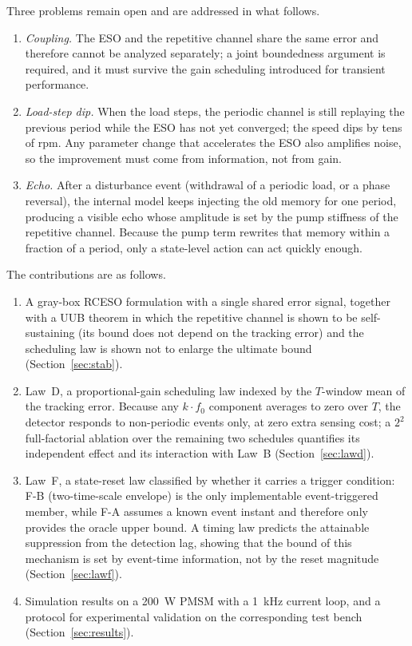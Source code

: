 \documentclass[journal]{IEEEtran}
\theoremstyle{remark}
\begin{document}
Three problems remain open and are addressed in what follows.
\begin{enumerate}
\item \emph{Coupling.} The ESO and the repetitive channel share the same
error and therefore cannot be analyzed separately; a joint boundedness argument is
required, and it must survive the gain scheduling introduced for transient performance.
\item \emph{Load-step dip.} When the load steps, the periodic channel is still
replaying the previous period while the ESO has not yet converged; the speed dips by
tens of rpm. Any parameter change that accelerates the ESO also amplifies noise, so
the improvement must come from information, not from gain.
\item \emph{Echo.} After a disturbance event (withdrawal of a periodic load, or a
phase reversal), the internal model keeps injecting the old memory for one period,
producing a visible echo whose amplitude is set by the pump stiffness of the
repetitive channel. Because the pump term rewrites that memory within a fraction of a
period, only a state-level action can act quickly enough.
\end{enumerate}

The contributions are as follows.
\begin{enumerate}
\item A gray-box RCESO formulation with a single shared error signal, together with
a UUB theorem in which the repetitive channel is shown to be self-sustaining (its
bound does not depend on the tracking error) and the scheduling law is shown not to
enlarge the ultimate bound (Section~\ref{sec:stab}).
\item Law~D, a proportional-gain scheduling law indexed by the $T$-window mean of the
tracking error. Because any $k\cdot f_0$ component averages to zero over $T$, the
detector responds to non-periodic events only, at zero extra sensing cost; a $2^2$
full-factorial ablation over the remaining two schedules quantifies its independent
effect and its interaction with Law~B (Section~\ref{sec:lawd}).
\item Law~F, a state-reset law classified by whether it carries a trigger condition:
F-B (two-time-scale envelope) is the only implementable event-triggered member, while
F-A assumes a known event instant and therefore only provides the oracle upper bound.
A timing law predicts the attainable suppression from the detection lag, showing that
the bound of this mechanism is set by event-time information, not by the reset
magnitude (Section~\ref{sec:lawf}).
\item Simulation results on a 200~W PMSM with a 1~kHz current loop, and a protocol for
experimental validation on the corresponding test bench
(Section~\ref{sec:results}).
\end{enumerate}
\end{document}
